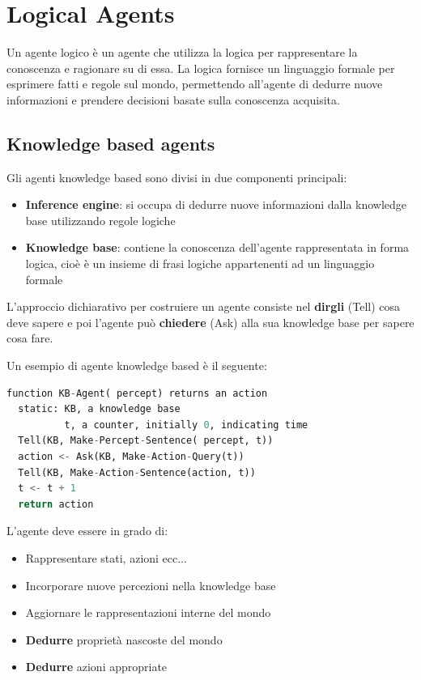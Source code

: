 \documentclass[a4paper]{article}
\begin{document}
\section{Logical Agents}
Un agente logico è un agente che utilizza la logica per rappresentare la conoscenza
e ragionare su di essa. La logica fornisce un linguaggio formale per esprimere fatti
e regole sul mondo, permettendo all'agente di dedurre nuove informazioni e prendere decisioni
basate sulla conoscenza acquisita.

\subsection{Knowledge based agents}
Gli agenti knowledge based sono divisi in due componenti principali:
\begin{itemize}
  \item \textbf{Inference engine}: si occupa di dedurre nuove informazioni dalla
    knowledge base utilizzando regole logiche
  \item \textbf{Knowledge base}: contiene la conoscenza dell'agente rappresentata
    in forma logica, cioè è un insieme di frasi logiche appartenenti ad un linguaggio
    formale
\end{itemize}
L'approccio dichiarativo per costruiere un agente consiste nel \textbf{dirgli} (Tell) cosa
deve sapere e poi l'agente può \textbf{chiedere} (Ask) alla sua knowledge base per
sapere cosa fare.

\vspace{1em}
\noindent
Un esempio di agente knowledge based è il seguente:
\begin{lstlisting}[language=Python]
function KB-Agent( percept) returns an action
  static: KB, a knowledge base
          t, a counter, initially 0, indicating time
  Tell(KB, Make-Percept-Sentence( percept, t))
  action <- Ask(KB, Make-Action-Query(t))
  Tell(KB, Make-Action-Sentence(action, t))
  t <- t + 1
  return action
\end{lstlisting}
L'agente deve essere in grado di:
\begin{itemize}
  \item Rappresentare stati, azioni ecc...
  \item Incorporare nuove percezioni nella knowledge base
  \item Aggiornare le rappresentazioni interne del mondo
  \item \textbf{Dedurre} proprietà nascoste del mondo
  \item \textbf{Dedurre} azioni appropriate
\end{itemize}
\end{document}
